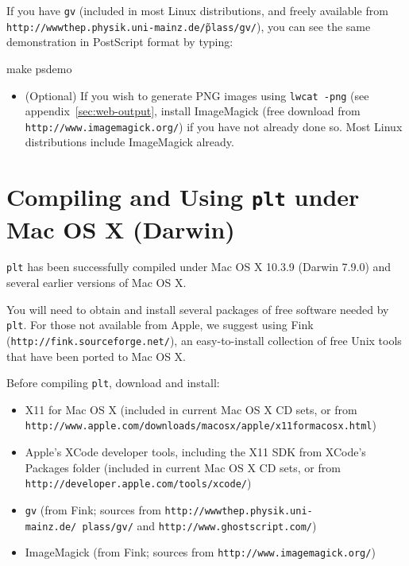 \documentclass{book}
\begin{document}
If you have {\tt gv} (included in most Linux distributions, and freely
available from {\tt http://wwwthep.physik.uni-mainz.de/\~plass/gv/}), you can
see the same demonstration in PostScript format by typing:
\begin{center}
\begin{boxedverbatim}
make psdemo
\end{boxedverbatim}
\end{center}

\begin{itemize}
\item
(Optional) If you wish to generate PNG images using {\tt lwcat -png}
(see appendix~\ref{sec:web-output}, install ImageMagick (free download
from {\tt http://www.image\-magick.org/}) if you have not already done
so.  Most Linux distributions include ImageMagick already.
\end{itemize}

\section{Compiling and Using {\tt plt} under Mac OS X (Darwin)}

{\tt plt} has been successfully compiled under Mac OS X 10.3.9 (Darwin 7.9.0)
and several earlier versions of Mac OS X.

You will need to obtain and install several packages of free software
needed by {\tt plt}.  For those not available from Apple, we suggest
using Fink ({\tt http://fink\-.source\-forge\-.net/}), an easy-to-install
collection of free Unix tools that have been ported to Mac OS X.

Before compiling {\tt plt}, download and install:
\begin{itemize}
\item
X11 for Mac OS X (included in current Mac OS X CD sets, or from
{\tt http://\-www.\-apple.\-com/\-downloads/\-macosx/\-apple/\-x11formacosx.html})
\item 
Apple's XCode developer tools, including the X11 SDK from XCode's Packages
folder (included in current Mac OS X CD sets, or from
{\tt http://\-developer.\-apple.\-com/\-tools/\-xcode/})
\item
{\tt gv} (from Fink; sources from
{\tt http://\-wwwthep.\-physik.\-uni-mainz.\-de/\-~plass/gv/}
and {\tt http://\-www.\-ghostscript.\-com/})
\item
ImageMagick (from Fink; sources from {\tt http://\-www.\-imagemagick.\-org/})
\end{itemize}
\end{document}
